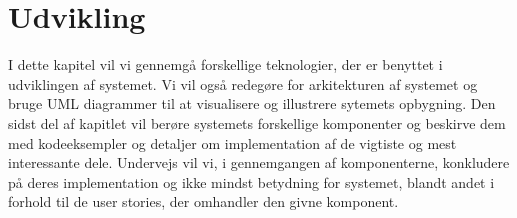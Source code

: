 \chapter{Udvikling}
I dette kapitel vil vi gennemgå forskellige teknologier, der er benyttet i udviklingen af systemet.
Vi vil også redegøre for arkitekturen af systemet og bruge UML diagrammer til at visualisere og illustrere sytemets opbygning.
Den sidst del af kapitlet vil berøre systemets forskellige komponenter og beskirve dem med kodeeksempler og detaljer om implementation af de vigtiste og mest interessante dele. 
Undervejs vil vi, i gennemgangen af komponenterne, konkludere på deres implementation og ikke mindst betydning for systemet, blandt andet i forhold til de user stories, der omhandler den givne komponent.








